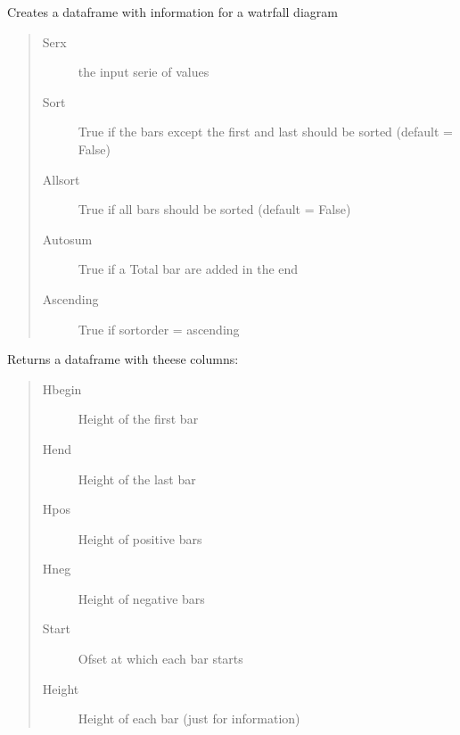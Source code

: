 \documentclass[letterpaper,10pt,english]{sphinxmanual}
\begin{document}

\begin{fulllineitems}
\label{\detokenize{vis/modelvis:modelvis.water}}
\pysigstartsignatures
{}
\pysigstopsignatures
\sphinxAtStartPar
Creates a dataframe with information for a watrfall diagram
\begin{quote}\begin{description}
\item[{Serx}] \leavevmode
\sphinxAtStartPar
the input serie of values

\item[{Sort}] \leavevmode
\sphinxAtStartPar
True if the bars except the first and last should be sorted (default = False)

\item[{Allsort}] \leavevmode
\sphinxAtStartPar
True if all bars should be sorted (default = False)

\item[{Autosum}] \leavevmode
\sphinxAtStartPar
True if a Total bar are added in the end

\item[{Ascending}] \leavevmode
\sphinxAtStartPar
True if sortorder = ascending

\end{description}\end{quote}

\sphinxAtStartPar
Returns a dataframe with theese columns:
\begin{quote}\begin{description}
\item[{Hbegin}] \leavevmode
\sphinxAtStartPar
Height of the first bar

\item[{Hend}] \leavevmode
\sphinxAtStartPar
Height of the last bar

\item[{Hpos}] \leavevmode
\sphinxAtStartPar
Height of positive bars

\item[{Hneg}] \leavevmode
\sphinxAtStartPar
Height of negative bars

\item[{Start}] \leavevmode
\sphinxAtStartPar
Ofset at which each bar starts

\item[{Height}] \leavevmode
\sphinxAtStartPar
Height of each bar (just for information)

\end{description}\end{quote}

\end{fulllineitems}
\end{document}
